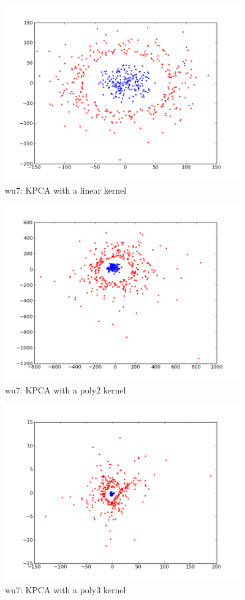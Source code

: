 \begin{figure}[here]
	\center
	\caption{wu7: KPCA with a linear kernel}
	\label{fig:wu7_linear}
	\includegraphics[width=4.0in]{img/wu7_linear.png}
\end{figure}

\begin{figure}[here]
	\center
	\caption{wu7: KPCA with a poly2 kernel}
	\label{fig:wu7_poly2}
	\includegraphics[width=4.0in]{img/wu7_poly2.png}
\end{figure}

\begin{figure}[here]
	\center
	\caption{wu7: KPCA with a poly3 kernel}
	\label{fig:wu7_poly3}
	\includegraphics[width=4.0in]{img/wu7_poly3.png}
\end{figure}

